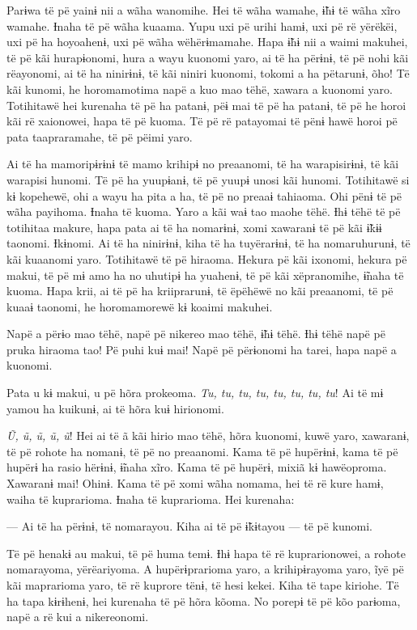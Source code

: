 Parɨwa të pë yainɨ nii a wãha wanomihe. Hei të wãha wamahe, ɨ̃hɨ të wãha
xĩro wamahe. Ɨnaha të pë wãha kuaama. Yupu uxi pë urihi hamɨ, uxi pë rë
yërëkëi, uxi pë ha hoyoahenɨ, uxi pë wãha wëhërɨmamahe. Hapa ɨ̃hɨ nii a
waimi makuhei, të pë kãi hurapɨonomi, hura a wayu kuonomi yaro, ai të ha
përɨnɨ, të pë nohi kãi rëayonomi, ai të ha ninirɨnɨ, të kãi niniri
kuonomi, tokomi a ha pëtarunɨ, õho! Të kãi kunomi, he horomamotima napë
a kuo mao tëhë, xawara a kuonomi yaro. Totihitawë hei kurenaha të pë ha
patanɨ, pëɨ mai të pë ha patanɨ, të pë he horoi kãi rë xaionowei, hapa
të pë kuoma. Të pë rë patayomai të pënɨ hawë horoi pë pata taapraramahe,
të pë pëimi yaro. 

Ai të ha mamoripɨrɨnɨ të mamo krihipɨ no preaanomi, të ha warapisirɨnɨ,
të kãi warapisi hunomi. Të pë ha yuupɨanɨ, të pë yuupɨ unosi kãi hunomi.
Totihitawë si kɨ kopehewë, ohi a wayu ha pita a ha, të pë no preaaɨ
tahiaoma. Ohi pënɨ të pë wãha payihoma. Ɨnaha të kuoma. Yaro a kãi waɨ
tao maohe tëhë. Ɨhɨ tëhë të pë totihitaa makure, hapa pata ai të ha
nomarɨnɨ, xomi xawaranɨ të pë kãi ɨ̃kɨɨ taonomi. Ɨkɨnomi. Ai të ha
ninirɨnɨ, kiha të ha tuyërarɨnɨ, të ha nomaruhurunɨ, të kãi kuaanomi
yaro. Totihitawë të pë hiraoma. Hekura pë kãi ixonomi, hekura pë makui,
të pë mɨ amo ha no uhutipɨ ha yuahenɨ, të pë kãi xëpranomihe, ɨ̃naha të
kuoma. Hapa krii, ai të pë ha kriiprarunɨ, të ëpëhëwë no kãi preaanomi,
të pë kuaaɨ taonomi, he horomamorewë kɨ koaimi makuhei. 

Napë a përɨo mao tëhë, napë pë nikereo mao tëhë, ɨ̃hɨ tëhë. Ɨhɨ tëhë napë
pë pruka hiraoma tao! Pë puhi kuɨ mai! Napë pë përɨonomi ha tarei, hapa
napë a kuonomi. 

Pata u kɨ makui, u pë hõra prokeoma. \textit{Tu, tu, tu, tu, tu, tu, tu, tu}! Ai
të mɨ yamou ha kuikunɨ, ai të hõra kuɨ hirionomi. 

\textit{Ũ, ũ, ũ, ũ, ũ}! Hei ai të ã kãi hirio mao tëhë, hõra kuonomi, kuwë
 yaro, xawaranɨ, të pë rohote ha nomanɨ, të pë no preaanomi. Kama të pë
 hupërɨnɨ, kama të pë hupërɨ ha rasio hërɨnɨ, ɨ̃naha xĩro. Kama të pë
 hupërɨ, mixiã kɨ hawëoproma. Xawaranɨ mai! Ohinɨ. Kama të pë xomi wãha
 nomama, hei të rë kure hamɨ, waiha të kuprarioma. Ɨnaha të kuprarioma.
 Hei kurenaha: 

--- Ai të ha përɨnɨ, të nomarayou. Kiha ai të pë ɨ̃kɨtayou --- të pë
kunomi. 

Të pë henakɨ au makui, të pë huma temɨ. Ɨhɨ hapa të rë kuprarionowei, a
rohote nomarayoma, yërëariyoma. A hupërɨprarioma yaro, a krihipɨrayoma
yaro, ĩyë pë kãi maprarioma yaro, të rë kuprore tënɨ, të hesi kekei.
Kiha të tape kiriohe. Të ha tapa kɨrɨhenɨ, hei kurenaha të pë hõra
kõoma. No porepɨ të pë kõo parɨoma, napë a rë kui a nikereonomi. 

